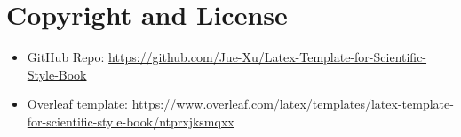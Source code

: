 \section{Copyright and License}

\begin{itemize}
    \item GitHub Repo: \url{https://github.com/Jue-Xu/Latex-Template-for-Scientific-Style-Book}
    \item Overleaf template: \url{https://www.overleaf.com/latex/templates/latex-template-for-scientific-style-book/ntprxjksmqxx}
\end{itemize}


